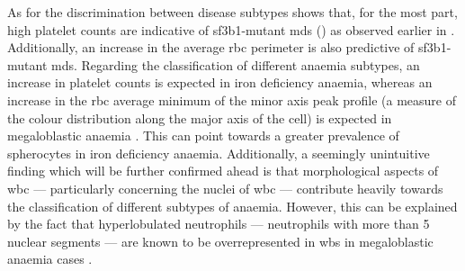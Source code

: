 \begin{figure}[!ht]
    \label{fig:feature-importance-disease-detection-classification}
\end{figure}

As for the discrimination between disease subtypes shows that, for the most part, high platelet counts are indicative of \ac{sf3b1}-mutant \ac{mds} () as observed earlier in . Additionally, an increase in the average \ac{rbc} perimeter is also predictive of \ac{sf3b1}-mutant \ac{mds}. Regarding the classification of different anaemia subtypes, an increase in platelet counts is expected in iron deficiency anaemia, whereas an increase in the \ac{rbc} average minimum of the minor axis peak profile (a measure of the colour distribution along the major axis of the cell) is expected in megaloblastic anaemia . This can point towards a greater prevalence of spherocytes in iron deficiency anaemia. Additionally, a seemingly unintuitive finding which will be further confirmed ahead is that morphological aspects of \ac{wbc} --- particularly concerning the nuclei of \ac{wbc} --- contribute heavily towards the classification of different subtypes of anaemia. However, this can be explained by the fact that hyperlobulated neutrophils --- neutrophils with more than 5 nuclear segments --- are known to be overrepresented in \ac{wbs} in megaloblastic anaemia cases \cite{Hariz2021-qw}.

\begin{figure}[!ht]
    \label{fig:feature-importance-mds}
\end{figure}

\begin{figure}[!ht]
    \label{fig:feature-importance-anaemia}
\end{figure}

